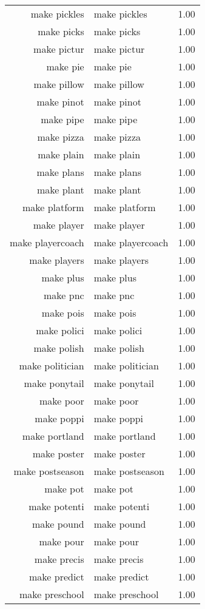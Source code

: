 \begin{table}[ht]
\begin{tabular}{rlr}
  make pickles & make pickles & 1.00 \\ 
  make picks & make picks & 1.00 \\ 
  make pictur & make pictur & 1.00 \\ 
  make pie & make pie & 1.00 \\ 
  make pillow & make pillow & 1.00 \\ 
  make pinot & make pinot & 1.00 \\ 
  make pipe & make pipe & 1.00 \\ 
  make pizza & make pizza & 1.00 \\ 
  make plain & make plain & 1.00 \\ 
  make plans & make plans & 1.00 \\ 
  make plant & make plant & 1.00 \\ 
  make platform & make platform & 1.00 \\ 
  make player & make player & 1.00 \\ 
  make playercoach & make playercoach & 1.00 \\ 
  make players & make players & 1.00 \\ 
  make plus & make plus & 1.00 \\ 
  make pnc & make pnc & 1.00 \\ 
  make pois & make pois & 1.00 \\ 
  make polici & make polici & 1.00 \\ 
  make polish & make polish & 1.00 \\ 
  make politician & make politician & 1.00 \\ 
  make ponytail & make ponytail & 1.00 \\ 
  make poor & make poor & 1.00 \\ 
  make poppi & make poppi & 1.00 \\ 
  make portland & make portland & 1.00 \\ 
  make poster & make poster & 1.00 \\ 
  make postseason & make postseason & 1.00 \\ 
  make pot & make pot & 1.00 \\ 
  make potenti & make potenti & 1.00 \\ 
  make pound & make pound & 1.00 \\ 
  make pour & make pour & 1.00 \\ 
  make precis & make precis & 1.00 \\ 
  make predict & make predict & 1.00 \\ 
  make preschool & make preschool & 1.00 \\ 

\end{tabular}
\end{table}
